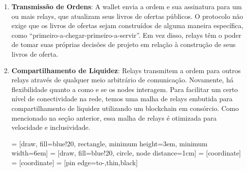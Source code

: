 \documentclass[UTF8,nofonts]{article}
\makeatletter
\newenvironment{figurehere}
 {\def\@captype{figure}}
 {}
\makeatother
\begin{document}
\begin{multicols}{2}
\begin{enumerate}
\item \textbf{Transmissão de Ordens}: A wallet envia a ordem e sua assinatura para um ou mais relays, que atualizam seus livros de ofertas públicos. O protocolo não exige que os livros de ofertas sejam construídos de alguma maneira específica, como “primeiro-a-chegar-primeiro-a-servir”. Em vez disso, relays têm o poder de tomar suas próprias decisões de projeto em relação à construção de seus livros de oferta.

\item \textbf{Compartilhamento de Liquidez}: Relays transmitem a ordem para outros relays através de qualquer meio arbitrário de comunicação. Novamente, há flexibilidade quanto a como e se os nodes interagem. Para facilitar um certo nível de conectividade na rede, temos uma malha de relays embutida para compartilhamento de liquidez utilizando um blockchain em consórcio. Como mencionado na seção anterior, essa malha de relays é otimizada para velocidade e inclusividade. 

\begin{center}
\begin{figurehere}
\centering
{} = [draw, fill=blue!20, rectangle, 
    minimum height=3em, minimum width=6em]
 = [draw, fill=blue!20, circle, node distance=1cm]
 = [coordinate]
 = [coordinate]
 = [pin edge={to-,thin,black}]

\end{figurehere}
\end{center}
\end{enumerate}
\end{multicols}
\end{document}

